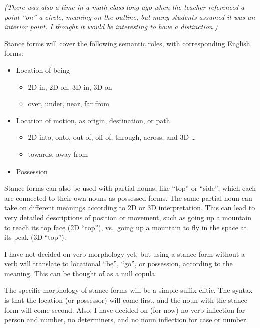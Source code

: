 \documentclass[12pt]{article}
\begin{document}
    \textit{
        (There was also a time in a math class long ago when the teacher
        referenced a point ``on'' a circle,
        meaning on the outline,
        but many students assumed it was an interior point.
        I thought it would be interesting to have a distinction.)
    }

    Stance forms will cover the following semantic roles,
    with corresponding English forms:
    \begin{itemize}
        \item
        Location of being
        \begin{itemize}
            \item 2D in, 2D on, 3D in, 3D on
            \item over, under, near, far from
        \end{itemize}
        \item
        Location of motion, as origin, destination, or path
        \begin{itemize}
            \item 2D into, onto, out of, off of, through, across, and 3D \dots
            \item towards, away from
        \end{itemize}
        \item
        Possession
    \end{itemize}

    Stance forms can also be used with partial nouns,
    like ``top'' or ``side'',
    which each are connected to their own nouns as possessed forms.
    The same partial noun can take on different meanings according to 2D or 3D interpretation.
    This can lead to very detailed descriptions of position or movement,
    such as going up a mountain to reach its top face (2D ``top''),
    vs.\ going up a mountain to fly in the space at its peak (3D ``top'').

    I have not decided on verb morphology yet,
    but using a stance form without a verb will translate to
    locational ``be'',
    ``go'', or possession,
    according to the meaning.
    This can be thought of as a null copula.

    The specific morphology of stance forms will be a simple suffix clitic.
    The syntax is that the location (or possessor) will come first,
    and the noun with the stance form will come second.
    Also, I have decided on (for now) no verb inflection for person and number,
    no determiners,
    and no noun inflection for case or number.
\end{document}
